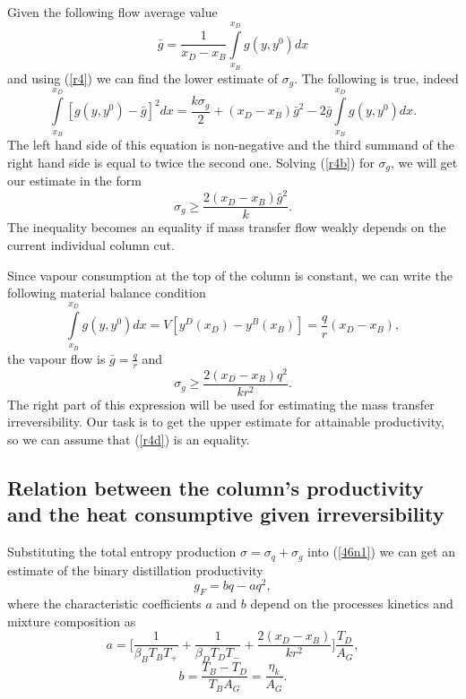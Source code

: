 \documentclass[12pt]{article}
\begin{document}
Given the following flow average value
\begin{equation}
\bar{g}=\frac{1}{x_D-x_B}\int\limits^{x_D}_{x_B} g(y, y^0)dx
\label{r4a}
\end{equation}
and using (\ref{r4}) we can find the lower estimate of $\sigma_g$. The following is true, indeed
\begin{equation}
\int\limits^{x_D}_{x_B} [g(y, y^0)-\bar{g}]^2 dx=\frac{k\sigma_g}{2}+(x_D-x_B)\bar{g}^2-2\bar{g}\int\limits^{x_D}_{x_B} g(y, y^0)dx.
\label{r4b}
\end{equation}
The left hand side of this equation is non-negative and the third summand of the right hand side is equal to twice the second one. Solving (\ref{r4b}) for $\sigma_g$, we will get our estimate in the form
\begin{equation}
\sigma_g\geq\frac{2(x_D-x_B)\bar{g}^2}{k}.
\label{r4c}
\end{equation}
The inequality becomes an equality if mass transfer flow weakly depends on the current individual column cut.

Since vapour consumption at the top of the column is constant, we can write the following material balance condition 
\begin{equation}
\int\limits^{x_{D}}_{x_{B}}\!g(y , y^0 ) dx=V[y^D(x_D)-y^B(x_B)]=\frac{q}{r}(x_D-x_B),
\label{q8}
\end{equation}
the vapour flow is $\bar{g}=\frac{q}{r}$ and
\begin{equation}
\sigma_g\geq\frac{2(x_D-x_B)q^2}{kr^2}.
\label{r4d}
\end{equation}
The right part of this expression will be used for estimating the mass transfer irreversibility. Our task is to get the upper estimate for attainable productivity, so we can assume that (\ref{r4d}) is an equality.

\subsection {Relation between the column's productivity and the heat consumptive given irreversibility}
Substituting the total entropy production $\sigma = \sigma_q + \sigma_g$ into (\ref{46n1}) we can get an estimate of the binary distillation productivity
\begin{equation}
g_F= bq-aq^2, 
\label{w4e}
\end{equation} 
where the characteristic coefficients $a$ and $b$ depend on the processes kinetics and mixture composition as
 \begin{equation}
 a=\Big[\frac{1}{\beta_{B}T_B T_{+}} +\frac{1}{\beta_{D}T_D T_{-}}+\frac{2(x_D-x_B)}{kr^2}\Big]\frac{T_D}{A_G},
\label{r4e}
\end{equation} 
\begin{equation}
 b=\frac{T_B - T_D}{T_B A_G}=\frac{\eta_k}{A_G}.
\label{b4e}
\end{equation} 
\end{document}

